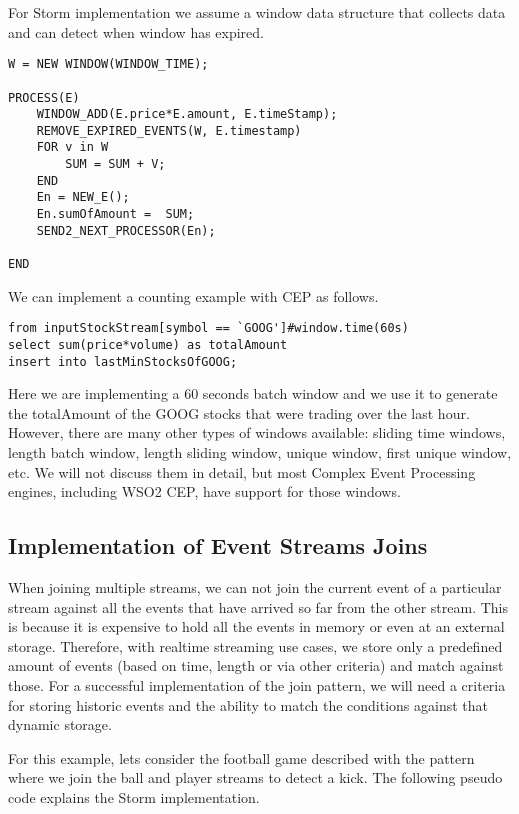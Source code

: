 \documentclass{sig-alternate}
\begin{document}
{For Storm implementation we assume a window data structure that collects data and can detect when window has expired. 

\begin{lstlisting}[mathescape, showstringspaces=false]
W = NEW WINDOW(WINDOW_TIME); 

PROCESS(E) 
	WINDOW_ADD(E.price*E.amount, E.timeStamp); 
	REMOVE_EXPIRED_EVENTS(W, E.timestamp)
	FOR v in W
		SUM = SUM + V; 
	END
	En = NEW_E(); 
	En.sumOfAmount =  SUM; 
	SEND2_NEXT_PROCESSOR(En); 
	
END
\end{lstlisting}


We can implement a counting example with CEP as follows.

\begin{lstlisting}[mathescape, showstringspaces=false]
from inputStockStream[symbol == `GOOG']#window.time(60s)
select sum(price*volume) as totalAmount
insert into lastMinStocksOfGOOG; 
\end{lstlisting}


Here we are implementing a 60 seconds batch window and we use it to generate the totalAmount of the GOOG stocks that were trading over the last hour. However, there are many other types of windows available:  sliding time windows, length batch window, length sliding window, unique window, first unique window, etc.  We will not discuss them in detail, but most Complex Event Processing engines, including WSO2 CEP, have support for those windows. 

\subsection{Implementation of Event Streams Joins}
When joining multiple streams, we can not join the current event of a particular stream against all the events that have arrived so far from the other stream. This is because it is expensive to hold all the events in memory or even at an external storage. Therefore, with realtime streaming use cases, we store only a predefined amount of events (based on time, length or via other criteria) and match against those. For a successful implementation of the join pattern, we will need a criteria for storing historic events and the ability to match the conditions against that dynamic storage. 

For this example, lets consider the football game described with the pattern where we join the ball and player streams to detect a kick. The following pseudo code explains the Storm implementation. 

}
\end{document}
